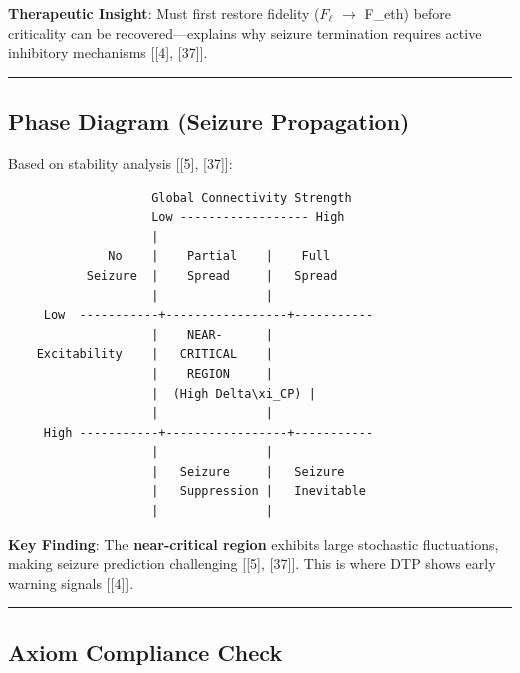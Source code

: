 \documentclass[12pt,a4paper]{article}
\begin{document}
\textbf{Therapeutic Insight}: Must first restore fidelity ($F_{\ell}$ $\rightarrow$ F\_eth) before criticality can be recovered---explains why seizure termination requires active inhibitory mechanisms {[}{[}4{]}, {[}37{]}{]}.

\begin{center}
\rule{0.5\textwidth}{0.4pt}
\end{center}

\subsection{Phase Diagram (Seizure Propagation)}

Based on stability analysis {[}{[}5{]}, {[}37{]}{]}:

\begin{lstlisting}
                    Global Connectivity Strength
                    Low ------------------ High
                    |
              No    |    Partial    |    Full
           Seizure  |    Spread     |   Spread
                    |               |
     Low  -----------+-----------------+-----------
                    |    NEAR-      |
    Excitability    |   CRITICAL    |
                    |    REGION     |
                    |  (High Delta\xi_CP) |
                    |               |
     High -----------+-----------------+-----------
                    |               |
                    |   Seizure     |   Seizure
                    |   Suppression |   Inevitable
                    |               |
\end{lstlisting}

\textbf{Key Finding}: The \textbf{near-critical region} exhibits large stochastic fluctuations, making seizure prediction challenging {[}{[}5{]}, {[}37{]}{]}. This is where DTP shows early warning signals {[}{[}4{]}{]}.

\begin{center}
\rule{0.5\textwidth}{0.4pt}
\end{center}

\subsection{Axiom Compliance Check}
\end{document}
